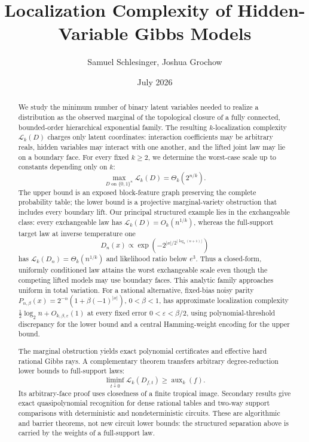 \documentclass{article}
\title{Localization Complexity of Hidden-Variable Gibbs Models}
\author{Samuel Schlesinger, Joshua Grochow}
\date{July 2026}
\newcommand{\LC}{\mathcal{L}}
\begin{document}
\maketitle

\begin{abstract}
We study the minimum number of binary latent variables needed to realize a
distribution as the observed marginal of the topological closure of a fully
connected, bounded-order hierarchical exponential family.  The resulting
$k$-localization complexity $\LC_k(D)$ charges only latent coordinates:
interaction coefficients may be arbitrary reals, hidden variables may
interact with one another, and the lifted joint law may lie on a boundary
face.  For every fixed $k\ge2$, we determine the worst-case scale up to constants
depending only on $k$:
\[
  \max_{D\text{ on }\{0,1\}^n}\LC_k(D)=\Theta_k(2^{n/k}).
\]
The upper bound is an exposed block-feature graph preserving the complete
probability table; the lower bound is a projective marginal-variety
obstruction that includes every boundary lift.  Our principal structured
example lies in the exchangeable class: every exchangeable law has
$\LC_k(D)=O_k(n^{1/k})$, whereas the full-support target law at inverse
temperature one
\[
  D_n(x)\propto
  \exp\!\left(-2^{|x|/2^{\lfloor\log_2(n+1)\rfloor}}\right)
\]
has $\LC_k(D_n)=\Theta_k(n^{1/k})$ and likelihood ratio below $e^3$.
Thus a closed-form, uniformly conditioned law attains the worst exchangeable
scale even though the competing lifted models may use boundary faces.
This analytic family approaches uniform in total variation.  For a rational
alternative, fixed-bias noisy parity
$P_{n,\beta}(x)=2^{-n}(1+\beta(-1)^{|x|})$, $0<\beta<1$, has approximate
localization complexity $\frac12\log_2 n+O_{k,\beta,\varepsilon}(1)$ at every
fixed error $0<\varepsilon<\beta/2$, using polynomial-threshold discrepancy
for the lower bound and a central Hamming-weight encoding for the upper bound.

The marginal obstruction yields exact polynomial certificates and effective
hard rational Gibbs rays.  A complementary theorem transfers arbitrary
degree-reduction lower bounds to full-support laws:
\[
  \liminf_{t\downarrow0}\LC_k(D_{f,t})
  \ge \operatorname{aux}_k(f).
\]
Its arbitrary-face proof uses closedness of a finite tropical image.
Secondary results give exact quasipolynomial recognition for dense rational
tables and two-way support comparisons with deterministic and
nondeterministic circuits.  These are algorithmic and barrier theorems, not
new circuit lower bounds: the structured separation above is carried by the
weights of a full-support law.
\end{abstract}
\end{document}
